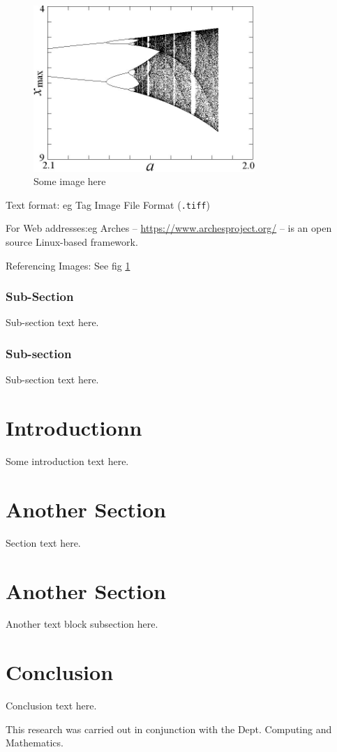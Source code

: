 \documentclass{ifacconf}
\begin{document}
\begin{figure}
	\begin{center}
		\includegraphics[width=8.4cm]{bifurcation}    %
		\caption{Some image here} 
		\label{fig:my_fig1}
	\end{center}
\end{figure}

Text format: eg Tag Image File Format (\texttt{.tiff})

For Web addresses:eg  Arches -- \url{https://www.archesproject.org/} -- is an open source Linux-based framework.

Referencing Images: See fig \ref{fig:my_fig1}

\subsubsection{Sub-Section}Sub-section text here.

\subsubsection{Sub-section}Sub-section text here.

\section{Introductionn}

Some introduction text here.

\section{Another Section}
Section text here.

\section{Another Section}

Another text block subsection here.

\section{Conclusion}

Conclusion text here.

\begin{ack}
This research was carried out in conjunction with the Dept. Computing and Mathematics.
\end{ack}


             
\end{document}
